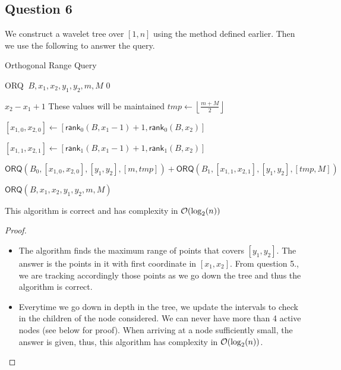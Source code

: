 \documentclass{cours}
\begin{document}
\subsection{Question 6}
We construct a wavelet tree over $[1, n]$ using the method defined earlier. 
Then we use the following to answer the query.
\begin{algorithm}
    \caption{Orthogonal Range Query}
    \begin{algorithmic}
        \Function \textsf{ORQ}
        \Input $\ B, x_{1}, x_{2}, y_{1}, y_{2}, m, M$
        \EndInput
        \If {$[m, M] \cap [y_{1}, y_{2}] = \emptyset$}
            \State \Return $0$
        \EndIf

        \If {$[m, M] \subseteq [y_{1}, y_{2}]$}
            \State \Return $x_{2} - x_{1} + 1$ \Comment These values will be maintained
        \EndIf
        \State
        \State $tmp \gets \left\lfloor \frac{m + M}{2} \right\rfloor$
        
        \State $[x_{1, 0}, x_{2, 0}] \gets \left[\textsf{rank}_{0}(B, x_{1} - 1) + 1, \textsf{rank}_{0}(B, x_{2}) \right]$

        \State $[x_{1, 1}, x_{2, 1}] \gets \left[\textsf{rank}_{1}(B, x_{1} - 1) + 1, \textsf{rank}_{1}(B, x_{2}) \right]$

        \Return $\textsf{ORQ}(B_{0}, [x_{1, 0}, x_{2, 0}], [y_{1}, y_{2}], [m, tmp]) + \textsf{ORQ}(B_{1}, [x_{1, 1}, x_{2, 1}], [y_{1}, y_{2}], [tmp, M])$
        \EndFunction

        \State $\textsf{ORQ}(B, x_{1}, x_{2}, y_{1}, y_{2}, m, M)$

    \end{algorithmic}
\end{algorithm}

\begin{theorem}
    This algorithm is correct and has complexity in $\mathcal{O}(\log_{2}(n))$
\end{theorem}
\begin{proof}
    \begin{itemize}
        \item The algorithm finds the maximum range of points that covers $[y_{1}, y_{2}]$. The answer is the points in it with first coordinate in $[x_{1}, x_{2}]$. From question 5., we are tracking accordingly those points as we go down the tree and thus the algorithm is correct.
        \item Everytime we go down in depth in the tree, we update the intervals to check in the children of the node considered. We can never have more than 4 active nodes (see below for proof). When arriving at a node sufficiently small, the answer is given, thus, this algorithm has complexity in $\mathcal{O}(\log_{2}(n))$.
    \end{itemize}
\end{proof}
\end{document}
